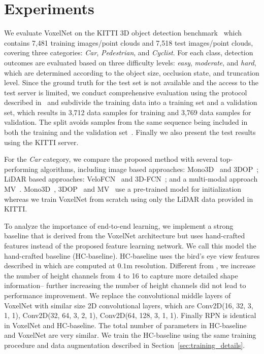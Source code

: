 \documentclass[10pt,twocolumn,letterpaper]{article}
\begin{document}
\section{Experiments}
\label{sec:Experiment}
We evaluate VoxelNet on the KITTI 3D object detection benchmark~\cite{REF:Geiger2012CVPR} which contains 7,481 training images/point clouds and 7,518 test images/point clouds, covering three categories: \textit{Car}, \textit{Pedestrian}, and \textit{Cyclist}. For each class, detection outcomes are evaluated based on three difficulty levels: \textit{easy}, \textit{moderate}, and \textit{hard}, which are determined according to the object size, occlusion state, and truncation level. Since the ground truth for the test set is not available and the access to the test server is limited, we conduct comprehensive evaluation using the protocol described in~\cite{REF:nips15chen,REF:cvpr16chen,REF:cvpr17chen} and subdivide the training data into a training set and a validation set, which results in 3,712 data samples for training and 3,769 data samples for validation. The split avoids samples from the same sequence being included in both the training and the validation set~\cite{REF:cvpr16chen}. Finally we also present the test results using the KITTI server.

For the \textit{Car} category, we compare the proposed method with several top-performing algorithms, including image based approaches: Mono3D~\cite{REF:cvpr16chen} and 3DOP~\cite{REF:nips15chen}; LiDAR based approaches: VeloFCN~\cite{REF:VeloFCN} and 3D-FCN~\cite{REF:3DFCN}; and a multi-modal approach MV~\cite{REF:cvpr17chen}. Mono3D~\cite{REF:cvpr16chen}, 3DOP~\cite{REF:nips15chen} and MV~\cite{REF:cvpr17chen}  use a pre-trained model for initialization whereas we train VoxelNet from scratch using only the LiDAR data provided in KITTI.

To analyze the importance of end-to-end learning, we implement a strong baseline that is derived from the VoxelNet architecture but uses hand-crafted features instead of the proposed feature learning network. We call this model the hand-crafted baseline (HC-baseline). HC-baseline uses the bird's eye view features described in 
\cite{REF:cvpr17chen} which are computed at $0.1$m resolution. Different from \cite{REF:cvpr17chen}, we increase the number of height channels from 4 to 16 to capture more detailed shape information-- further increasing the number of height channels did not lead to performance improvement. We replace the convolutional middle layers of VoxelNet with similar size 2D convolutional layers, which are Conv2D(16, 32, 3, 1, 1), Conv2D(32, 64, 3, 2, 1), Conv2D(64, 128, 3, 1, 1). Finally RPN is identical in VoxelNet and HC-baseline. The total number of parameters in HC-baseline and VoxelNet are very similar. We train the HC-baseline using the same training procedure and data augmentation described in Section~\ref{sec:training_details}. 
\end{document}
